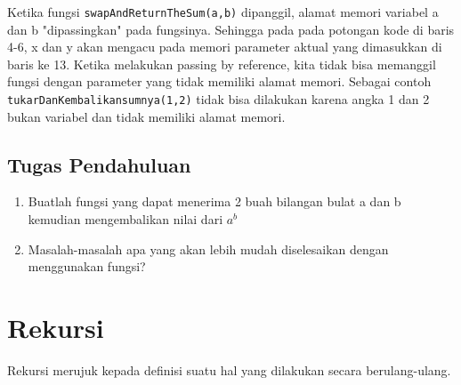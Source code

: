 Ketika fungsi \verb|swapAndReturnTheSum(a,b)| dipanggil, alamat memori variabel a dan b "dipassingkan" pada fungsinya. Sehingga pada pada potongan kode di baris 4-6, x dan y akan mengacu pada memori parameter aktual yang dimasukkan di baris ke 13. Ketika melakukan passing by reference, kita tidak bisa memanggil fungsi dengan parameter yang tidak memiliki alamat memori. Sebagai contoh \verb|tukarDanKembalikansumnya(1,2)| tidak bisa dilakukan karena angka 1 dan 2 bukan variabel dan tidak memiliki alamat memori.

\subsection{Tugas Pendahuluan}
\begin{enumerate}
   \item Buatlah fungsi yang dapat menerima 2 buah bilangan bulat a dan b kemudian mengembalikan nilai dari $a^b$
   \item Masalah-masalah apa yang akan lebih mudah diselesaikan dengan menggunakan fungsi?
\end{enumerate}

\section{Rekursi}
Rekursi merujuk kepada definisi suatu hal yang dilakukan secara berulang-ulang.

